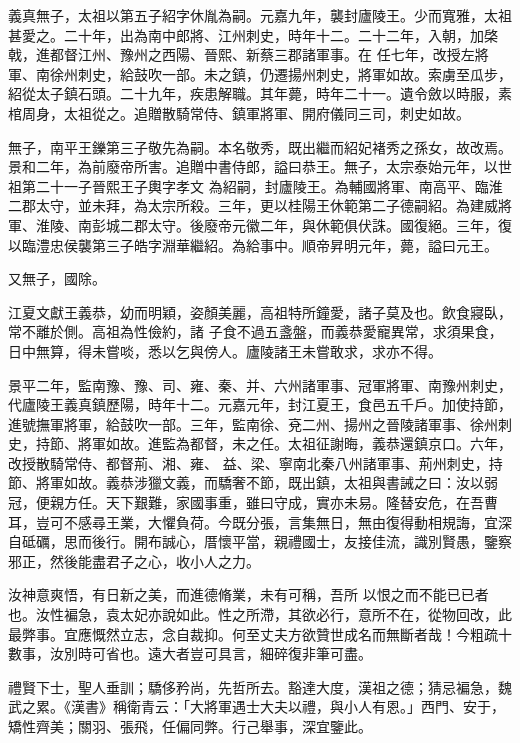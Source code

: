 \begin{pinyinscope}
 義真無子，太祖以第五子紹字休胤為嗣。元嘉九年，襲封廬陵王。少而寬雅，太祖甚愛之。二十年，出為南中郎將、江州刺史，時年十二。二十二年，入朝，加棨戟，進都督江州、豫州之西陽、晉熙、新蔡三郡諸軍事。在
 任七年，改授左將軍、南徐州刺史，給鼓吹一部。未之鎮，仍遷揚州刺史，將軍如故。索虜至瓜步，紹從太子鎮石頭。二十九年，疾患解職。其年薨，時年二十一。遺令斂以時服，素棺周身，太祖從之。追贈散騎常侍、鎮軍將軍、開府儀同三司，刺史如故。



 無子，南平王鑠第三子敬先為嗣。本名敬秀，既出繼而紹妃褚秀之孫女，故改焉。景和二年，為前廢帝所害。追贈中書侍郎，謚曰恭王。無子，太宗泰始元年，以世祖第二十一子晉熙王子輿字孝文
 為紹嗣，封廬陵王。為輔國將軍、南高平、臨淮二郡太守，並未拜，為太宗所殺。三年，更以桂陽王休範第二子德嗣紹。為建威將軍、淮陵、南彭城二郡太守。後廢帝元徽二年，與休範俱伏誅。國復絕。三年，復以臨澧忠侯襲第三子皓字淵華繼紹。為給事中。順帝昇明元年，薨，謚曰元王。



 又無子，國除。



 江夏文獻王義恭，幼而明穎，姿顏美麗，高祖特所鐘愛，諸子莫及也。飲食寢臥，常不離於側。高祖為性儉約，諸
 子食不過五盞盤，而義恭愛寵異常，求須果食，日中無算，得未嘗啖，悉以乞與傍人。廬陵諸王未嘗敢求，求亦不得。



 景平二年，監南豫、豫、司、雍、秦、并、六州諸軍事、冠軍將軍、南豫州刺史，代廬陵王義真鎮歷陽，時年十二。元嘉元年，封江夏王，食邑五千戶。加使持節，進號撫軍將軍，給鼓吹一部。三年，監南徐、兗二州、揚州之晉陵諸軍事、徐州刺史，持節、將軍如故。進監為都督，未之任。太祖征謝晦，義恭還鎮京口。六年，改授散騎常侍、都督荊、湘、雍、
 益、梁、寧南北秦八州諸軍事、荊州刺史，持節、將軍如故。義恭涉獵文義，而驕奢不節，既出鎮，太祖與書誡之曰：汝以弱冠，便親方任。天下艱難，家國事重，雖曰守成，實亦未易。隆替安危，在吾曹耳，豈可不感尋王業，大懼負荷。今既分張，言集無日，無由復得動相規誨，宜深自砥礪，思而後行。開布誠心，厝懷平當，親禮國士，友接佳流，識別賢愚，鑒察邪正，然後能盡君子之心，收小人之力。



 汝神意爽悟，有日新之美，而進德脩業，未有可稱，吾所
 以恨之而不能已已者也。汝性褊急，袁太妃亦說如此。性之所滯，其欲必行，意所不在，從物回改，此最弊事。宜應慨然立志，念自裁抑。何至丈夫方欲贊世成名而無斷者哉！今粗疏十數事，汝別時可省也。遠大者豈可具言，細碎復非筆可盡。



 禮賢下士，聖人垂訓；驕侈矜尚，先哲所去。豁達大度，漢祖之德；猜忌褊急，魏武之累。《漢書》稱衛青云：「大將軍遇士大夫以禮，與小人有恩。」西門、安于，矯性齊美；關羽、張飛，任偏同弊。行己舉事，深宜鑒此。




\end{pinyinscope}

